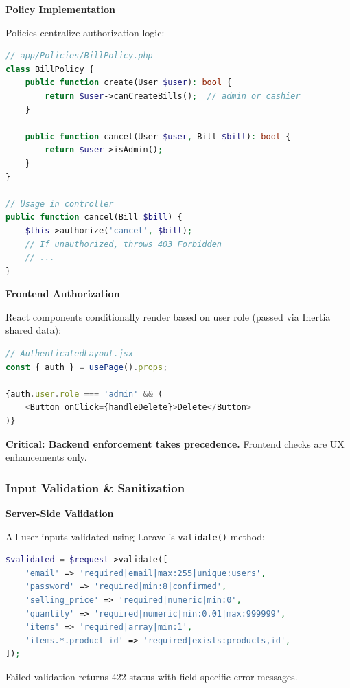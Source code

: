 \textbf{Policy Implementation}

Policies centralize authorization logic:

\begin{lstlisting}[language=PHP,label=lst:policy]
// app/Policies/BillPolicy.php
class BillPolicy {
    public function create(User $user): bool {
        return $user->canCreateBills();  // admin or cashier
    }
    
    public function cancel(User $user, Bill $bill): bool {
        return $user->isAdmin();
    }
}

// Usage in controller
public function cancel(Bill $bill) {
    $this->authorize('cancel', $bill);
    // If unauthorized, throws 403 Forbidden
    // ...
}
\end{lstlisting}

\textbf{Frontend Authorization}

React components conditionally render based on user role (passed via Inertia shared data):

\begin{lstlisting}[language=JavaScript,label=lst:frontend-auth]
// AuthenticatedLayout.jsx
const { auth } = usePage().props;

{auth.user.role === 'admin' && (
    <Button onClick={handleDelete}>Delete</Button>
)}
\end{lstlisting}

\textbf{Critical: Backend enforcement takes precedence.} Frontend checks are UX enhancements only.

\subsubsection{Input Validation \& Sanitization}

\textbf{Server-Side Validation}

All user inputs validated using Laravel's \texttt{validate()} method:

\begin{lstlisting}[language=PHP,label=lst:validation]
$validated = $request->validate([
    'email' => 'required|email|max:255|unique:users',
    'password' => 'required|min:8|confirmed',
    'selling_price' => 'required|numeric|min:0',
    'quantity' => 'required|numeric|min:0.01|max:999999',
    'items' => 'required|array|min:1',
    'items.*.product_id' => 'required|exists:products,id',
]);
\end{lstlisting}

Failed validation returns 422 status with field-specific error messages.

